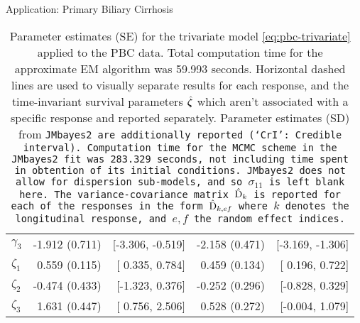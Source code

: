 \begin{chapter}{\label{cha:app-PBC}Application: Primary Biliary Cirrhosis}
\begin{table}[ht]
\begin{tabular}{lrrrr}
        $\gamma_3$ & -1.912 (0.711) & [-3.306, -0.519] & -2.158 (0.471) & [-3.169, -1.306] \\ 
        \hdashline
        $\zeta_1$ &  0.559 (0.115) & [ 0.335, 0.784] &  0.459 (0.134) & [ 0.196, 0.722] \\ 
        $\zeta_2$ & -0.474 (0.433) & [-1.323, 0.376] & -0.252 (0.296) & [-0.828, 0.329] \\ 
        $\zeta_3$ &  1.631 (0.447) & [ 0.756, 2.506] &  0.528 (0.272) & [-0.004, 1.079] \\ 
    \hline
    \end{tabular}
    \endgroup
    \caption{Parameter estimates (SE) for the trivariate model \eqref{eq:pbc-trivariate} applied to the PBC data. Total computation time for the approximate EM algorithm was 59.993 seconds. Horizontal dashed lines are used to visually separate results for each response, and the time-invariant survival parameters $\hat{\bm{\zeta}}$ which aren't associated with a specific response and reported separately. Parameter estimates (SD) from \tt{JMbayes2} are additionally reported (`CrI': Credible interval). Computation time for the MCMC scheme in the \tt{JMbayes2} fit was 283.329 seconds, not including time spent in obtention of its initial conditions. \tt{JMbayes2} does not allow for dispersion sub-models, and so $\sigma_{11}$ is left blank here. The variance-covariance matrix $\hat{\mathrm{D}}_k$ is reported for each of the responses in the form $\hat{\mathrm{D}}_{k,ef}$ where $k$ denotes the longitudinal response, and $e,f$ the random effect indices.}
    \label{tab:pbc-trivmodel}
  \end{table}


\end{chapter}
